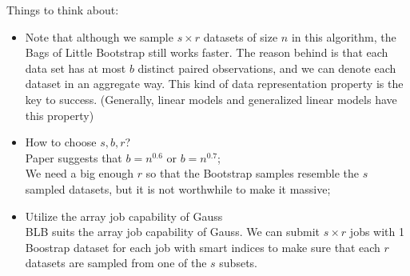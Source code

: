 \documentclass[article]{memoir}
\DeclareMathOperator{\1}{\mathbf{1}}
\theoremstyle{definition}
\begin{document}
Things to think about:
\begin{itemize}
\item Note that although we sample $s\times r$ datasets of size $n$ in this algorithm, the Bags of Little Bootstrap still works faster. The reason behind is that each data set has at most $b$ distinct paired observations, and we can denote each dataset in an aggregate way. This kind of data representation property is the key to success. (Generally, linear models and generalized linear models have this property)\\

\item How to choose $s, b, r$?\\
    Paper suggests that $b = n^{0.6}$ or $b = n^{0.7}$;\\
    We need a big enough $r$ so that the Bootstrap samples resemble the $s$ sampled datasets, but it is not worthwhile to make it massive;\\

\item Utilize the array job capability of Gauss\\
    BLB suits the array job capability of Gauss. We can submit $s\times r$ jobs with 1 Boostrap dataset for each job with smart indices to make sure that each $r$ datasets are sampled from one of the $s$ subsets.
    
    
\end{itemize}
\end{document}

